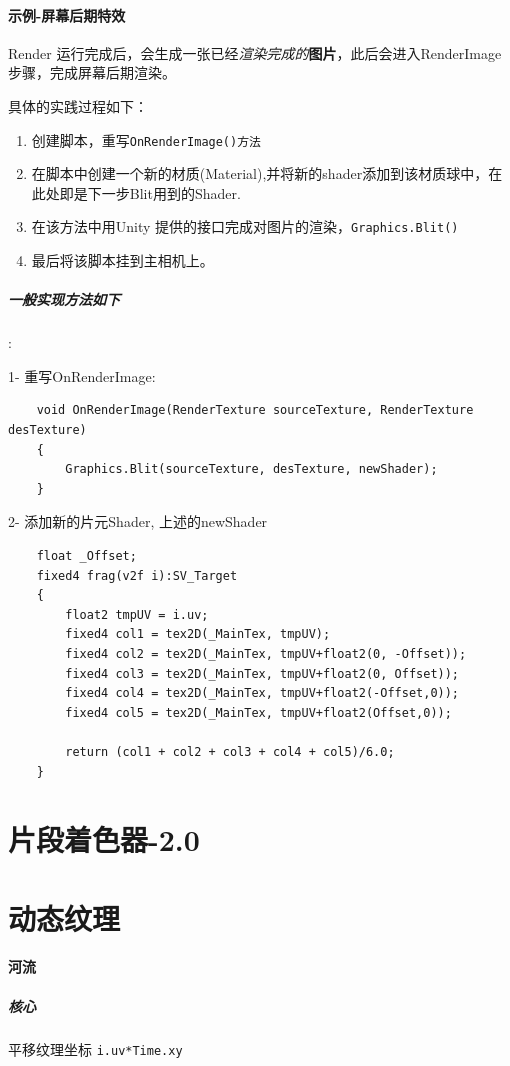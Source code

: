 \documentclass[UTF8,a4paper,12pt]{ctexbook}
\begin{document}
			
		\paragraph{示例-屏幕后期特效}
			Render 运行完成后，会生成一张已经\textit{渲染完成的}\textbf{图片}，此后会进入RenderImage 步骤，完成屏幕后期渲染。
			
			具体的实践过程如下：
				\begin{enumerate}[itemindent = 1em]
					\item 创建脚本，重写\verb|OnRenderImage()方法|
					\item 在脚本中创建一个新的材质(Material),并将新的shader添加到该材质球中，在此处即是下一步Blit用到的Shader.
					\item 在该方法中用Unity 提供的接口完成对图片的渲染，\verb|Graphics.Blit()|
					\item 最后将该脚本挂到主相机上。
				\end{enumerate}
		
			\subparagraph{一般实现方法如下}:
			
			1- 重写OnRenderImage:
			
			\begin{lstlisting}
	void OnRenderImage(RenderTexture sourceTexture, RenderTexture desTexture)
	{
		Graphics.Blit(sourceTexture, desTexture, newShader);
	}	
			\end{lstlisting}
		
			2- 添加新的片元Shader, 上述的newShader
			
			\begin{lstlisting}
	float _Offset;
	fixed4 frag(v2f i):SV_Target
	{
		float2 tmpUV = i.uv;
		fixed4 col1 = tex2D(_MainTex, tmpUV);
		fixed4 col2 = tex2D(_MainTex, tmpUV+float2(0, -Offset));
		fixed4 col3 = tex2D(_MainTex, tmpUV+float2(0, Offset));
		fixed4 col4 = tex2D(_MainTex, tmpUV+float2(-Offset,0));
		fixed4 col5 = tex2D(_MainTex, tmpUV+float2(Offset,0));
		
		return (col1 + col2 + col3 + col4 + col5)/6.0;
	}
			\end{lstlisting}
			
		
	\section{片段着色器-2.0 }
	
	\section{动态纹理}
		 \paragraph{河流}
			\subparagraph{核心}
				平移纹理坐标
				\verb|i.uv*Time.xy|
	
\end{document}
